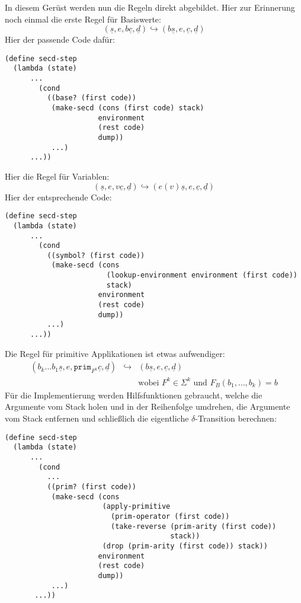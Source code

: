 %
In diesem Gerüst werden nun die Regeln direkt abgebildet.  Hier zur
Erinnerung noch einmal die erste Regel für Basiswerte:
%
\begin{displaymath}
  (\underline{s}, e, b\underline{c}, \underline{d})
  \hookrightarrow
  (b\underline{s}, e, \underline{c}, \underline{d})
\end{displaymath}
%
Hier der passende Code dafür:
%
\begin{lstlisting}
(define secd-step
  (lambda (state)
      ...
        (cond
          ((base? (first code))
           (make-secd (cons (first code) stack)
                      environment
                      (rest code)
                      dump))
           ...)
      ...))
\end{lstlisting}
%
Hier die Regel für Variablen:
\begin{displaymath}
  (\underline{s}, e, v\underline{c}, \underline{d})
  \hookrightarrow
  (e(v)\underline{s}, e, \underline{c}, \underline{d})
\end{displaymath}
%
Hier der entsprechende Code:
%
\begin{lstlisting}
(define secd-step
  (lambda (state)
      ...
        (cond
          ((symbol? (first code))
           (make-secd (cons
                        (lookup-environment environment (first code))
                        stack)
                      environment
                      (rest code)
                      dump))
          ...)
      ...))
\end{lstlisting}
%
Die Regel für primitive Applikationen ist etwas aufwendiger:
%
\begin{eqnarray*}
  (b_k\ldots b_1 \underline{s}, e, \mathtt{prim}_{F^k}\underline{c}, \underline{d})
  &\hookrightarrow&
  (b\underline{s}, e, \underline{c}, \underline{d})
  \\ && \textrm{wobei $F^k\in\Sigma^k$ und $F_B(b_1,\ldots,b_k) = b$}
\end{eqnarray*}
%
Für die Implementierung werden Hilfsfunktionen gebraucht, welche die
Argumente vom Stack holen und in der Reihenfolge umdrehen, die
Argumente vom Stack entfernen und schließlich die eigentliche
$\delta$-Transition berechnen:
%
\begin{lstlisting}
(define secd-step
  (lambda (state)
      ...
        (cond
          ...
          ((prim? (first code))
           (make-secd (cons
                       (apply-primitive
                         (prim-operator (first code))
                         (take-reverse (prim-arity (first code)) 
                                       stack))
                       (drop (prim-arity (first code)) stack))
                      environment
                      (rest code)
                      dump))
           ...)
       ...))
\end{lstlisting}

